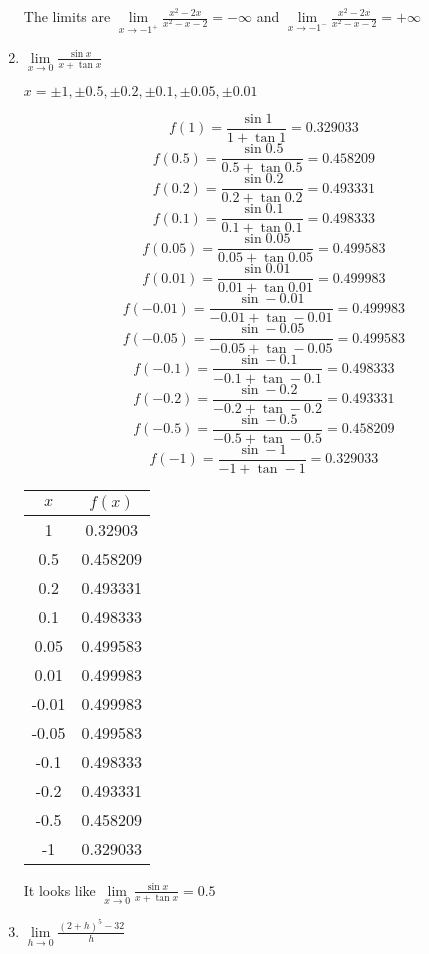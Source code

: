 \documentclass{article}
\begin{document}
\begin{enumerate}
				The limits are $\lim \limits _{x \to -1^{+}}  \frac{x^2 - 2x}{x^2 - x - 2} = -\infty$ and
				$\lim \limits _{x \to -1^{-}} \frac{x^2 - 2x}{x^2 - x - 2} = +\infty$
				
			\item $\lim \limits _{x \to 0} \frac{\sin x}{x + \tan x}$
			
				$x = \pm 1, \pm 0.5, \pm 0.2, \pm 0.1, \pm 0.05, \pm 0.01$
				
				$$f(1) = \frac{\sin 1}{1 + \tan 1} = 0.329033$$
				$$f(0.5) = \frac{\sin 0.5}{0.5 + \tan 0.5} = 0.458209$$
				$$f(0.2) = \frac{\sin 0.2}{0.2 + \tan 0.2} = 0.493331$$
				$$f(0.1) = \frac{\sin 0.1}{0.1 + \tan 0.1} = 0.498333$$
				$$f(0.05) = \frac{\sin 0.05}{0.05 + \tan 0.05} = 0.499583$$
				$$f(0.01) = \frac{\sin 0.01}{0.01 + \tan 0.01} = 0.499983$$
				$$f(-0.01) = \frac{\sin -0.01}{-0.01 + \tan -0.01} = 0.499983$$
				$$f(-0.05) = \frac{\sin -0.05}{-0.05 + \tan -0.05} = 0.499583$$
				$$f(-0.1) = \frac{\sin - 0.1} {-0.1 + \tan -0.1} = 0.498333$$
				$$f(-0.2) = \frac{\sin -0.2}{-0.2 + \tan -0.2} = 0.493331$$
				$$f(-0.5) = \frac{\sin -0.5}{-0.5 + \tan -0.5} = 0.458209$$
				$$f(-1) = \frac{\sin -1}{-1 + \tan -1} =0.329033$$
				
				\begin{center}
				\begin{tabular}{|c|c|}
				\hline
				$x$ & $f(x)$ \\
				\hline \hline
				1 &  0.32903 \\
				0.5 & 0.458209 \\
				0.2 &  0.493331 \\
				0.1 &  0.498333 \\
				0.05 & 0.499583 \\
				0.01 &  0.499983 \\
				-0.01 & 0.499983 \\
				-0.05 & 0.499583\\
				-0.1 &  0.498333 \\
				-0.2 &  0.493331 \\
				-0.5 & 0.458209 \\
				-1 & 0.329033 \\
				\hline
				\end{tabular}
				\end{center}
				
				It looks like $\lim \limits _{x \to 0} \frac{\sin x}{x + \tan x} = 0.5$
			
			\item 	$\lim \limits _{h \to 0} \frac{(2 + h)^5 - 32}{h}$
			

\end{enumerate}
\end{document}
